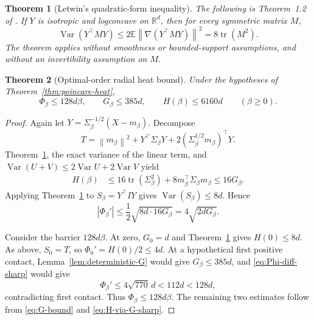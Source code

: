 \documentclass[11pt]{article}
\newtheorem{theorem}{Theorem}[section]
\theoremstyle{remark}
\newcommand{\R}{\mathbb R}
\newcommand{\E}{\mathbb E}
\newcommand{\1}{\bm 1}
\newcommand{\Var}{\operatorname{Var}}
\newcommand{\tr}{\operatorname{tr}}
\newcommand{\norm}[1]{\left\lVert #1\right\rVert}
\newcommand{\abs}[1]{\left|#1\right|}
\begin{document}
\begin{theorem}[Letwin's quadratic-form inequality]
\label{thm:letwin}
The following is Theorem~1.2 of \citet{Letwin26KLS}.
If $Y$ is isotropic and logconcave on $\R^d$, then for every symmetric
matrix $M$,
\begin{equation}\label{eq:letwin}
  \Var(Y^\top MY)
  \leq2\E\norm{\nabla(Y^\top MY)}^2
  =8\tr(M^2).
\end{equation}
The theorem applies without smoothness or bounded-support assumptions,
and without an invertibility assumption on $M$.
\end{theorem}

\begin{theorem}[Optimal-order radial heat bound]
\label{thm:sharp-heat}
Under the hypotheses of Theorem~\ref{thm:poincare-heat},
\begin{equation}\label{eq:sharp-heat-result}
  \Phi_\beta\leq128d\beta,
  \qquad
  G_\beta\leq385d,
  \qquad
  H(\beta)\leq6160d
  \qquad(\beta\geq0).
\end{equation}
\end{theorem}

\begin{proof}
Again let $Y=\Sigma_\beta^{-1/2}(X-m_\beta)$.  Decompose
\begin{equation}\label{eq:T-decomposition}
  T=\norm{m_\beta}^2
    +Y^\top\Sigma_\beta Y
    +2(\Sigma_\beta^{1/2}m_\beta)^\top Y.
\end{equation}
Theorem~\ref{thm:letwin}, the exact variance of the linear term, and
$\Var(U+V)\leq2\Var U+2\Var V$ yield
\begin{align}
  H(\beta)
  &\leq16\tr(\Sigma_\beta^2)
       +8m_\beta^\top\Sigma_\beta m_\beta
   \leq16G_\beta.
  \label{eq:H-via-G-sharp}
\end{align}
Applying Theorem~\ref{thm:letwin} to $S_\beta=Y^\top IY$ gives
$\Var(S_\beta)\leq8d$.  Hence
\begin{equation}\label{eq:Phi-diff-sharp}
  \abs{\Phi_\beta'}
  \leq\frac12\sqrt{8d\cdot16G_\beta}
  =4\sqrt{2dG_\beta}.
\end{equation}

Consider the barrier $128d\beta$.  At zero, $G_0=d$ and
Theorem~\ref{thm:letwin} gives $H(0)\leq8d$.  As above, $S_0=T$, so
$\Phi_0'=H(0)/2\leq4d$.  At a hypothetical first positive contact,
Lemma~\ref{lem:deterministic-G} would give $G_\beta\leq385d$, and
\eqref{eq:Phi-diff-sharp} would give
\[
  \Phi_\beta'\leq4\sqrt{770}\,d<112d<128d,
\]
contradicting first contact.  Thus $\Phi_\beta\leq128d\beta$.
The remaining two estimates follow from \eqref{eq:G-bound} and
\eqref{eq:H-via-G-sharp}.
\end{proof}
\end{document}
